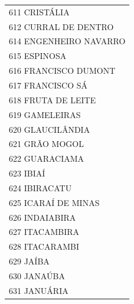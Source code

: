 \documentclass{article}
\begin{document}
\begin{longtable}[c]{m{18cm}}
\multicolumn{1}{l}{ \hspace{2em} 611 CRISTÁLIA } \\
\multicolumn{1}{l}{ \hspace{2em} 612 CURRAL DE DENTRO } \\
\multicolumn{1}{l}{ \hspace{2em} 614 ENGENHEIRO NAVARRO } \\
\multicolumn{1}{l}{ \hspace{2em} 615 ESPINOSA } \\
\multicolumn{1}{l}{ \hspace{2em} 616 FRANCISCO DUMONT } \\
\multicolumn{1}{l}{ \hspace{2em} 617 FRANCISCO SÁ } \\
\multicolumn{1}{l}{ \hspace{2em} 618 FRUTA DE LEITE } \\
\multicolumn{1}{l}{ \hspace{2em} 619 GAMELEIRAS } \\
\multicolumn{1}{l}{ \hspace{2em} 620 GLAUCILÂNDIA } \\
\multicolumn{1}{l}{ \hspace{2em} 621 GRÃO MOGOL } \\
\multicolumn{1}{l}{ \hspace{2em} 622 GUARACIAMA } \\
\multicolumn{1}{l}{ \hspace{2em} 623 IBIAÍ } \\
\multicolumn{1}{l}{ \hspace{2em} 624 IBIRACATU } \\
\multicolumn{1}{l}{ \hspace{2em} 625 ICARAÍ DE MINAS } \\
\multicolumn{1}{l}{ \hspace{2em} 626 INDAIABIRA } \\
\multicolumn{1}{l}{ \hspace{2em} 627 ITACAMBIRA } \\
\multicolumn{1}{l}{ \hspace{2em} 628 ITACARAMBI } \\
\multicolumn{1}{l}{ \hspace{2em} 629 JAÍBA } \\
\multicolumn{1}{l}{ \hspace{2em} 630 JANAÚBA } \\
\multicolumn{1}{l}{ \hspace{2em} 631 JANUÁRIA } \\

\end{longtable}
\end{document}
